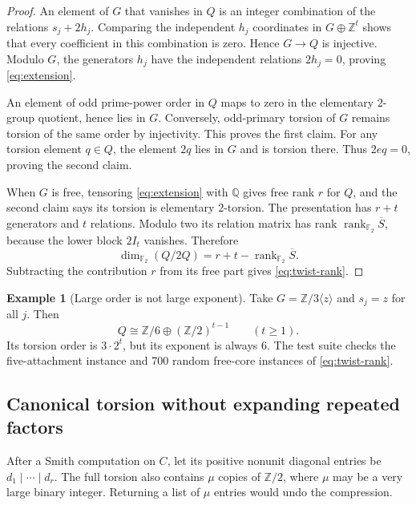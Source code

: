\documentclass[11pt]{article}
\theoremstyle{definition}
\newtheorem{example}[theorem]{Example}
\theoremstyle{remark}
\newcommand{\Z}{\mathbb Z}
\newcommand{\Q}{\mathbb Q}
\newcommand{\F}{\mathbb F_2}
\newcommand{\rank}{\operatorname{rank}}
\begin{document}
\begin{proof}
An element of $G$ that vanishes in $Q$ is an integer combination of the
relations $s_j+2h_j$. Comparing the independent $h_j$ coordinates in
$G\oplus\Z^t$ shows that every coefficient in this combination is zero.
Hence $G\to Q$ is injective. Modulo $G$, the generators $h_j$ have the
independent relations $2h_j=0$, proving \eqref{eq:extension}.

An element of odd prime-power order in $Q$ maps to zero in the elementary
$2$-group quotient, hence lies in $G$. Conversely, odd-primary torsion of
$G$ remains torsion of the same order by injectivity. This proves the first
claim. For any torsion element $q\in Q$, the element $2q$ lies in $G$ and is
torsion there. Thus $2eq=0$, proving the second claim.

When $G$ is free, tensoring \eqref{eq:extension} with $\Q$ gives free rank
$r$ for $Q$, and the second claim says its torsion is elementary $2$-torsion.
The presentation has $r+t$ generators and $t$ relations. Modulo two its
relation matrix has rank $\rank_{\F}\overline S$, because the lower block
$2I_t$ vanishes. Therefore
\[
 \dim_{\F}(Q/2Q)=r+t-\rank_{\F}\overline S.
\]
Subtracting the contribution $r$ from its free part gives
\eqref{eq:twist-rank}.
\end{proof}

\begin{example}[Large order is not large exponent]
Take $G=\Z/3\langle z\rangle$ and $s_j=z$ for all $j$. Then
\[
 Q\cong\Z/6\oplus(\Z/2)^{t-1}\qquad(t\geq1).
\]
Its torsion order is $3\cdot2^t$, but its exponent is always $6$.
The test suite checks the five-attachment instance and 700 random free-core
instances of \eqref{eq:twist-rank}.
\end{example}

\subsection{Canonical torsion without expanding repeated factors}
After a Smith computation on $C$, let its positive nonunit diagonal entries
be $d_1\mid\cdots\mid d_r$. The full torsion also contains $\mu$ copies of
$\Z/2$, where $\mu$ may be a very large binary integer. Returning a list of
$\mu$ entries would undo the compression.
\end{document}
